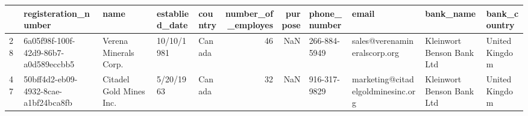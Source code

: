 \begin{tabular}{lllllrrllll}
\toprule
{} &                  registeration\_number &                     name & establied\_date & country &  number\_of\_employes &  purpose &  phone\_number &                              email &                  bank\_name &    bank\_country \\
\midrule
28 &  6a05f98f-100f-42d9-86b7-a0d589eccbb5 &    Verena Minerals Corp. &     10/10/1981 &  Canada &                  46 &      NaN &  266-884-5949 &       sales@verenamineralscorp.org &  Kleinwort Benson Bank Ltd &  United Kingdom \\
47 &  50bff4d2-eb09-4932-8cae-a1bf24bca8fb &  Citadel Gold Mines Inc. &      5/20/1963 &  Canada &                  32 &      NaN &  916-317-9829 &  marketing@citadelgoldminesinc.org &  Kleinwort Benson Bank Ltd &  United Kingdom \\
\bottomrule
\end{tabular}
